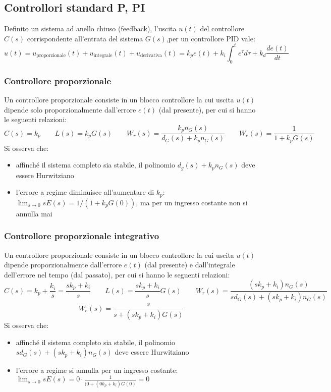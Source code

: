 \newpage

\subsection{Controllori standard P, PI}
Definito un sistema ad anello chiuso (feedback), l'uscita \(u(t)\) del controllore \(C(s)\) corrispondente all'entrata del
sistema \(G(s)\),per un controllore PID vale:
\[u(t) = u_\text{proporzionale}(t) + u_\text{integrale}(t) + u_\text{derivativa}(t) = k_pe(t) + k_i \int_{0}^{t}e^{\tau}d\tau + k_d\frac{de(t)}{dt}\]

\subsubsection*{Controllore proporzionale}
Un controllore proporzionale consiste in un blocco controllore la cui uscita \(u(t)\) dipende solo proporzionalmente dall'errore
\(e(t)\) (dal presente), per cui si hanno le seguenti relazioni:
\[C(s) = k_p \qquad L(s)=k_pG(s) \qquad W_r(s) = \frac{k_p n_G(s)}{d_G(s)+k_pn_G(s)} \qquad W_e(s) = \frac{1}{1+k_pG(s)}\]
Si osserva che:
\begin{itemize}
	\item affinché il sistema completo sia stabile, il polinomio \(d_g(s)+k_pn_G(s)\) deve essere Hurwitziano
	\item l'errore a regime diminuisce all'aumentare di \(k_p\): \(\displaystyle\lim_{s \to 0} sE(s) = 1/(1+k_pG(0))\), ma per un
	ingresso costante non si annulla mai
\end{itemize}

\subsubsection*{Controllore proporzionale integrativo}
Un controllore proporzionale consiste in un blocco controllore la cui uscita \(u(t)\) dipende proporzionalmente dall'errore
\(e(t)\) (dal presente) e dall'integrale dell'errore nel tempo (dal passato), per cui si hanno le seguenti relazioni:
\[C(s) = k_p + \frac{k_i}{s} = \frac{sk_p + k_i}{s} \qquad L(s)=\frac{sk_p + k_i}{s}G(s) \qquad W_r(s) = \frac{(sk_p + k_i) n_G(s)}{sd_G(s)+(sk_p + k_i)n_G(s)}\]
\[W_e(s) = \frac{s}{s+(sk_p+k_i)G(s)}\]
Si osserva che:
\begin{itemize}
	\item affinché il sistema completo sia stabile, il polinomio \(sd_G(s)+(sk_p + k_i)n_G(s)\) deve essere Hurwitziano
	\item l'errore a regime si annulla per un ingresso costante: \(\displaystyle\lim_{s \to 0} sE(s) = 0 \cdot \frac{1}{(0+(0k_p+k_i)G(0)} = 0\)
\end{itemize}

